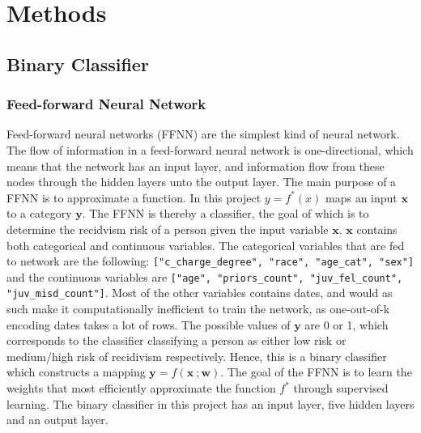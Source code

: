 \documentclass[11pt, fleqn, titlepage]{article}
\begin{document}
		
	\section{Methods} \label{methods}
	
	\subsection{Binary Classifier}\label{Feed-forward neural}
	\subsubsection{Feed-forward Neural Network}
	Feed-forward neural networks (FFNN) are the simplest kind of neural network. The flow of information in a feed-forward neural network is one-directional, which means that the network has an input layer, and information flow from these nodes through the hidden layers unto the output layer. The main purpose of a FFNN is to approximate a function. In this project $ y = f^*(x) $ maps an input $ \mathbf x $ to a category $ \mathbf y $. The FFNN is thereby a classifier, the goal of which is to determine the recidvism risk of a person given the input variable $ \mathbf x $. $ \mathbf x $ contains both categorical and continuous variables. The categorical variables that are fed to network are the following: \texttt{["c\_charge\_degree", "race", "age\_cat", "sex"]} and the continuous variables are \texttt{["age", "priors\_count", "juv\_fel\_count", "juv\_misd\_count"]}. Most of the other variables contains dates, and would as such make it computationally inefficient to train the network, as one-out-of-k encoding dates takes a lot of rows. The possible values of $ \mathbf y $ are 0 or 1, which corresponds to the classifier classifying a person as either low risk or medium/high risk of recidivism respectively. Hence, this is a binary classifier which constructs a mapping $ \mathbf y = f(\mathbf x \ ; \mathbf w) $. The goal of the FFNN is to learn the weights that most efficiently approximate the function $ f^* $ through supervised learning. The binary classifier in this project has an input layer, five hidden layers and an output layer. \cite{dl}
	
\end{document}
